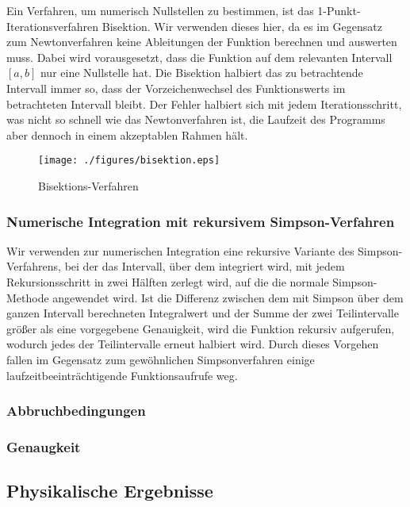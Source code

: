 \documentclass[10pt,a4paper]{article}
\begin{document}
Ein Verfahren, um numerisch Nullstellen zu bestimmen, ist das 1-Punkt-Iterationsverfahren Bisektion. Wir verwenden dieses hier, da es im Gegensatz zum Newtonverfahren keine Ableitungen der Funktion berechnen und auswerten muss. Dabei wird vorausgesetzt, dass die Funktion auf dem relevanten Intervall $[a,b]$ nur eine Nullstelle hat. Die Bisektion halbiert das zu betrachtende Intervall immer so, dass der Vorzeichenwechsel des Funktionswerts im betrachteten Intervall bleibt. Der Fehler halbiert sich mit jedem Iterationsschritt, was nicht so schnell wie das Newtonverfahren ist, die Laufzeit des Programms aber dennoch in einem akzeptablen Rahmen hält.
\begin{figure}[htbp]
\centering
\texttt{[image: ./figures/bisektion.eps]}
\caption{Bisektions-Verfahren}
\label{fig:bisektion}
\end{figure}

\subsubsection{Numerische Integration mit rekursivem Simpson-Verfahren}

Wir verwenden zur numerischen Integration eine rekursive Variante des Simpson-Verfahrens, bei der das Intervall, über dem integriert wird, mit jedem Rekursionsschritt in zwei Hälften zerlegt wird, auf die die normale Simpson-Methode angewendet wird. Ist die Differenz zwischen dem mit Simpson über dem ganzen Intervall berechneten Integralwert und der Summe der zwei Teilintervalle größer als eine vorgegebene Genauigkeit, wird die Funktion rekursiv aufgerufen, wodurch jedes der Teilintervalle erneut halbiert wird. Durch dieses Vorgehen fallen im Gegensatz zum gewöhnlichen Simpsonverfahren einige laufzeitbeeinträchtigende Funktionsaufrufe weg.

\subsubsection{Abbruchbedingungen}

\subsubsection{Genaugkeit}

\subsection{Physikalische Ergebnisse}
\label{ssec:physikalischeergebnisse}
\end{document}
